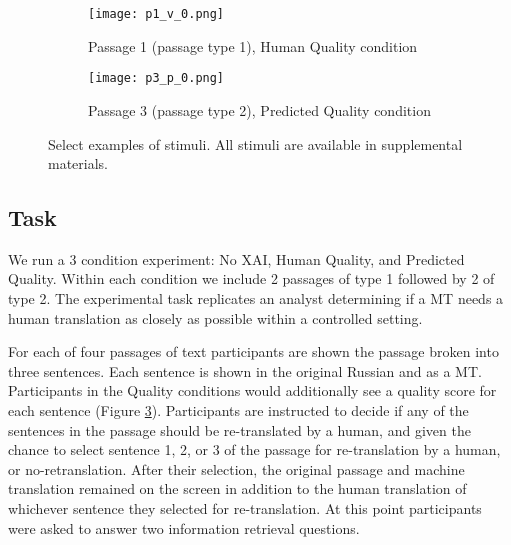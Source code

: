 \begin{figure}
    \centering
    
    \begin{subfigure}[t]{0.45\textwidth}
        \centering
        \texttt{[image: p1\_v\_0.png]} 
        \caption{Passage 1 (passage type 1), Human Quality condition} \label{fig:p1_human_quality}
    \end{subfigure}
    \hfill
     \begin{subfigure}[t]{0.45\textwidth}
        \centering
        \texttt{[image: p3\_p\_0.png]} 
        \caption{Passage 3 (passage type 2), Predicted Quality condition} \label{fig:p3_predicted_quality}
    \end{subfigure}
    
    \caption{Select examples of stimuli. All stimuli are available in supplemental materials.}
    \label{fig:exp_stim}
    
\end{figure}

\subsection{Task} 
We run a 3 condition experiment: No XAI, Human Quality, and Predicted Quality. Within each condition we include 2 passages of type 1 followed by 2 of type 2. The experimental task replicates an analyst determining if a MT needs a human translation as closely as possible within a controlled setting. 

For each of four passages of text participants are shown the passage broken into three sentences. Each sentence is shown in the original Russian and as a MT. Participants in the Quality conditions would additionally see a quality score for each sentence (Figure \ref{fig:exp_stim}). Participants are instructed to decide if any of the sentences in the passage should be re-translated by a human, and given the chance to select sentence 1, 2, or 3 of the passage for re-translation by a human, or no-retranslation. After their selection, the original passage and machine translation remained on the screen in addition to the human translation of whichever sentence they selected for re-translation. At this point participants were asked to answer two information retrieval questions. 


